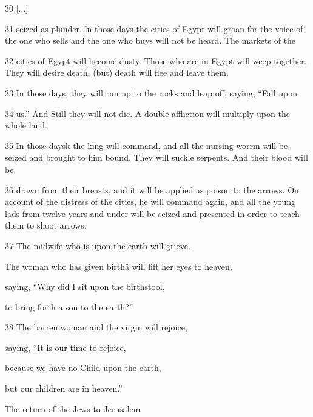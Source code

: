 \par 30 [...]

\par 31 seized as plunder. ln those days the cities of Egypt will groan for the voice of the one who sells and the one who buys will not be heard. The markets of the

\par 32 cities of Egypt will become dusty. Those who are in Egypt will weep together. They will desire death, (but) death will flee and leave them.

\par 33 In those days, they will run up to the rocks and leap off, saying, “Fall upon

\par 34 us.” And Still they will not die. A double affliction will multiply upon the whole land.

\par 35 In those daysk the king will command, and all the nursing worrm will be seized and brought to him bound. They will suckle serpents. And their blood will be

\par 36 drawn from their breasts, and it will be applied as poison to the arrows. On account of the distress of the cities, he will command again, and all the young lads from twelve years and under will be seized and presented in order to teach them to shoot arrows.

\par 37 The midwife who is upon the earth will grieve.

\par The woman who has given birthâ will lift her eyes to heaven,

\par saying, “Why did I sit upon the birthstool,

\par to bring forth a son to the earth?”

\par 38 The barren woman and the virgin will rejoice,

\par saying, “It is our time to rejoice,

\par because we have no Child upon the earth,

\par but our children are in heaven.”

\par The return of the Jews to Jerusalem

